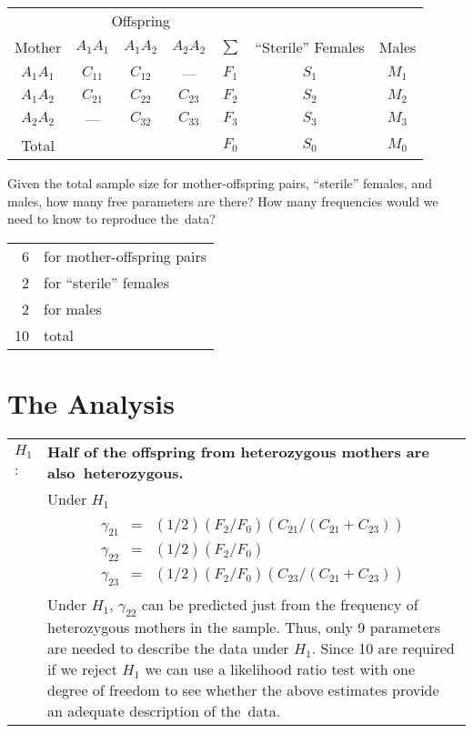 \begin{center}
\begin{tabular}{c|ccc|c|cc}
\multicolumn{1}{c}{} & \multicolumn{3}{c}{Offspring} \\
Mother & $A_{1}A_{1}$ & $A_{1}A_{2}$ & $A_{2}A_{2}$ & $\sum$ 
       & ``Sterile'' Females & Males\\
\hline
$A_{1}A_{1}$ & $C_{11}$ & $C_{12}$ & ---      & $F_{1}$ & $S_{1}$ & $M_{1}$\\
$A_{1}A_{2}$ & $C_{21}$ & $C_{22}$ & $C_{23}$ & $F_{2}$ & $S_{2}$ & $M_{2}$\\
$A_{2}A_{2}$ & ---      & $C_{32}$ & $C_{33}$ & $F_{3}$ & $S_{3}$ & $M_{3}$\\
\hline
Total        &          &          &          & $F_{0}$ & $S_{0}$ & $M_{0}$\\
\end{tabular}
\end{center}

\noindent Given the total sample size for mother-offspring pairs,
``sterile'' females, and males, how many free parameters are there?
How many frequencies would we need to know to reproduce the~data?

\begin{center}
\begin{tabular}{rl}
6 & for mother-offspring pairs \\
2 & for ``sterile'' females \\
2 & for males \\
\hline 
10 & total \\
\end{tabular}
\end{center}

\section*{The Analysis}

\begin{tabular}{@{}lp{6.0in}}
$H_{1}$: & {\bf Half of the offspring from heterozygous mothers
                 are also~heterozygous.} \\
& Under $H_1$ \\
& \begin{eqnarray*}
  \gamma_{21} &=& (1/2)(F_{2}/F_{0})(C_{21}/(C_{21}+C_{23})) \\
  \gamma_{22} &=& (1/2)(F_{2}/F_{0}) \\
  \gamma_{23} &=& (1/2)(F_{2}/F_{0})(C_{23}/(C_{21}+C_{23}))
  \end{eqnarray*} \\
& Under $H_1$, $\gamma_{22}$ can be predicted just from the
frequency of heterozygous mothers in the sample.  Thus, only 9
parameters are needed to describe the data under $H_1$.  Since 10 are
required if we reject $H_1$ we can use a likelihood ratio test with one 
degree of freedom to see whether the above estimates provide an adequate 
description of the~data.\\
\end{tabular}


